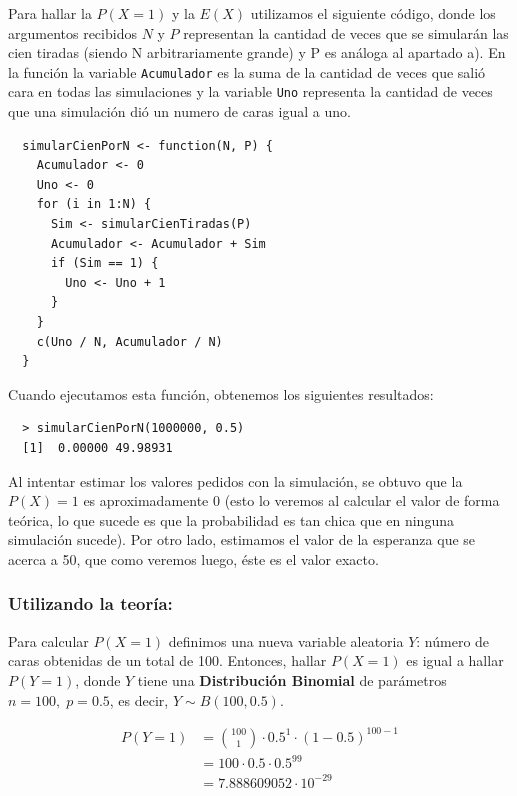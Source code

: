 \documentclass[11pt]{article}
\begin{document}
Para hallar la $ P(X = 1) $ y la $ E(X) $ utilizamos el siguiente código, 
donde los argumentos recibidos $ N $ y $ P $ representan la cantidad de veces
que se simularán las cien tiradas (siendo N arbitrariamente grande) y P
es análoga al apartado a). En la función la variable \texttt{Acumulador}
es la suma de la cantidad de veces que salió cara en todas las simulaciones
y la variable \texttt{Uno} representa la cantidad de veces que una simulación
dió un numero de caras igual a uno.

\begin{verbatim}
  simularCienPorN <- function(N, P) {
    Acumulador <- 0
    Uno <- 0
    for (i in 1:N) {
      Sim <- simularCienTiradas(P)
      Acumulador <- Acumulador + Sim
      if (Sim == 1) {
        Uno <- Uno + 1
      }
    }
    c(Uno / N, Acumulador / N)
  }
\end{verbatim}

Cuando ejecutamos esta función, obtenemos los siguientes resultados:

\begin{verbatim}
  > simularCienPorN(1000000, 0.5)
  [1]  0.00000 49.98931
\end{verbatim}

Al intentar estimar los valores pedidos con la simulación, se obtuvo que
la $ P(X) = 1 $ es aproximadamente 0 (esto lo veremos al calcular el valor
de forma teórica, lo que sucede es que la probabilidad es tan chica que en
ninguna simulación sucede). Por otro lado, estimamos el valor de la esperanza
que se acerca a 50, que como veremos luego, éste es el valor exacto.

\subsubsection*{Utilizando la teoría:}

Para calcular $ P(X = 1) $ definimos una nueva variable aleatoria
$ Y $: número de caras obtenidas de un total de 100. Entonces, hallar
$ P(X = 1) $ es igual a hallar $ P(Y = 1) $, donde $ Y $ tiene una \textbf{Distribución
Binomial} de parámetros $ n = 100, \; p = 0.5 $, es decir, $ Y \sim B(100, 0.5) $.

\begin{align*}
  P(Y = 1) &= \binom{100}{1} \cdot 0.5^1 \cdot (1 - 0.5)^{100 - 1} \\
           &= 100 \cdot 0.5 \cdot 0.5^{99} \\
           &= 7.888609052 \cdot 10^{-29}
\end{align*}
\end{document}
